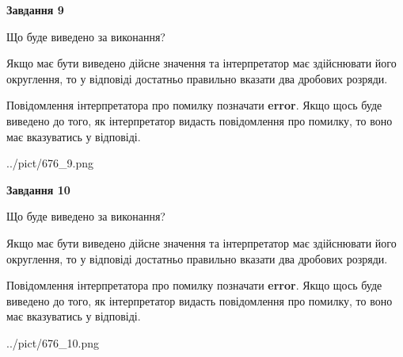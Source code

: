 \documentclass[12pt, ukrainian]{article}
\begin{document}
{\begin {Large}
{\begin {center}\textbf{Завдання 9}\end {center}}\par
Що буде виведено за виконання? \par

Якщо має бути виведено дійсне значення та інтерпретатор має здійснювати його округлення, 
то у відповіді достатньо правильно вказати два дробових розряди.

Повідомлення інтерпретатора про помилку позначати \textbf{error}.
Якщо щось буде виведено до того, як інтерпретатор видасть повідомлення про помилку, 
то воно має вказуватись у відповіді. \par

\begin{center}
	{../pict/676_9.png}
\end{center}
\newpage

{\begin {center}\textbf{Завдання 10}\end {center}}\par
Що буде виведено за виконання? \par

Якщо має бути виведено дійсне значення та інтерпретатор має здійснювати його округлення, 
то у відповіді достатньо правильно вказати два дробових розряди.

Повідомлення інтерпретатора про помилку позначати \textbf{error}.
Якщо щось буде виведено до того, як інтерпретатор видасть повідомлення про помилку, 
то воно має вказуватись у відповіді. \par

\begin{center}
	{../pict/676_10.png}
\end{center}
\newpage

\end {Large}}
\end{document}
